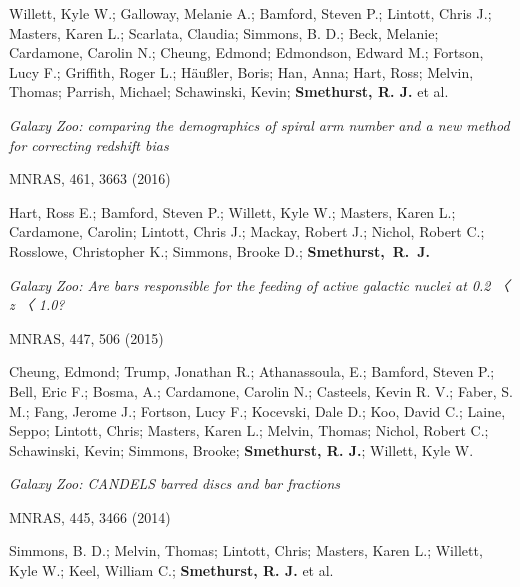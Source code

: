 \documentclass{article}
\begin{document}
\hangindent=30pt \indent \indent Willett, Kyle W.; Galloway, Melanie A.; Bamford, Steven P.; Lintott, Chris J.; Masters, Karen L.; Scarlata, Claudia; Simmons, B. D.; Beck, Melanie; Cardamone, Carolin N.; Cheung, Edmond; Edmondson, Edward M.; Fortson, Lucy F.; Griffith, Roger L.; Häußler, Boris; Han, Anna; Hart, Ross; Melvin, Thomas; Parrish, Michael; Schawinski, Kevin; {\bf Smethurst, R. J.} et al. 

\medskip

\hangindent=15pt \indent \emph{Galaxy Zoo: comparing the demographics of spiral arm number and a new method for correcting redshift bias}

\indent \indent MNRAS, 461, 3663 (2016)

\hangindent=30pt \indent \indent Hart, Ross E.; Bamford, Steven P.; Willett, Kyle W.; Masters, Karen L.; Cardamone, Carolin; Lintott, Chris J.; Mackay, Robert J.; Nichol, Robert C.; Rosslowe, Christopher K.; Simmons, Brooke D.; {
\bf Smethurst,~R.~J.}

\medskip

\hangindent=15pt \indent \emph{Galaxy Zoo: Are bars responsible for the feeding of active galactic nuclei at 0.2 〈 z 〈 1.0?}

\indent \indent MNRAS, 447, 506 (2015)

\hangindent=30pt \indent \indent Cheung, Edmond; Trump, Jonathan R.; Athanassoula, E.; Bamford, Steven P.; Bell, Eric F.; Bosma, A.; Cardamone, Carolin N.; Casteels, Kevin R. V.; Faber, S. M.; Fang, Jerome J.; Fortson, Lucy F.; Kocevski, Dale D.; Koo, David C.; Laine, Seppo; Lintott, Chris; Masters, Karen L.; Melvin, Thomas; Nichol, Robert C.; Schawinski, Kevin; Simmons, Brooke; {\bf Smethurst, R. J.}; Willett, Kyle W.

\medskip

\hangindent=15pt \indent \emph{Galaxy Zoo: CANDELS barred discs and bar fractions}

\indent \indent MNRAS, 445, 3466 (2014)

\hangindent=30pt \indent \indent Simmons, B. D.; Melvin, Thomas; Lintott, Chris; Masters, Karen L.; Willett, Kyle W.; Keel, William C.; {\bf Smethurst, R. J.} et al. 
\end{document}
